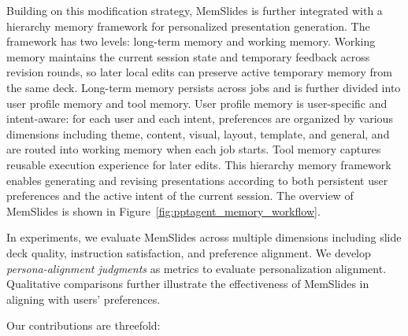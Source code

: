 \documentclass{llmxive}
\providecommand{\methodname}{MemSlides\xspace}
\begin{document}
Building on this modification strategy, \methodname is further integrated with a hierarchy memory
framework for personalized presentation generation. The framework has two
levels: long-term memory and working memory. Working memory maintains the
current session state and temporary feedback across revision rounds, so later
local edits can preserve active temporary memory from the same deck.
Long-term memory persists across jobs and is further divided into user profile
memory and tool memory. User profile memory is user-specific and intent-aware:
for each user and each intent, preferences are organized by various
dimensions including theme, content, visual, layout, template, and general, and are routed into working memory when each job starts. 
Tool memory captures reusable execution experience for later edits. This
hierarchy memory framework enables generating and revising presentations according to both
persistent user preferences and the active intent of the current session. The overview of \methodname is shown in Figure~\ref{fig:pptagent_memory_workflow}.

In experiments, we evaluate \methodname 
across multiple dimensions including slide deck quality, instruction satisfaction, and preference alignment. 
We develop \emph{persona-alignment judgments} as metrics to evaluate personalization alignment. 
Qualitative comparisons further illustrate the effectiveness of MemSlides in aligning with users' preferences.

Our contributions are threefold:
\begingroup
\end{document}
